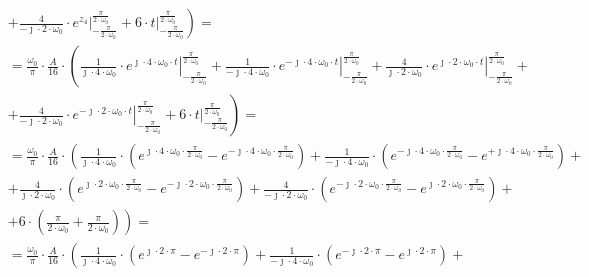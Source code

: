 \begin{task}
\begin{align*}
&\left.+\frac{4}{-\jmath \cdot 2 \cdot \omega_0} \cdot \left. e^{z_4}\right|_{-\frac{\pi}{2\cdot\omega_0}}^{\frac{\pi}{2\cdot\omega_0}} + 6 \cdot  \left.t \right|_{-\frac{\pi}{2\cdot\omega_0}}^{\frac{\pi}{2\cdot\omega_0}}\right)=\\
&=\frac{\omega_0}{\pi} \cdot \frac{A}{16} \cdot \left(\frac{1}{\jmath \cdot 4 \cdot \omega_0} \cdot \left. e^{\jmath \cdot 4 \cdot \omega_0 \cdot t}\right|_{-\frac{\pi}{2\cdot\omega_0}}^{\frac{\pi}{2\cdot\omega_0}} +\frac{1}{-\jmath \cdot 4 \cdot \omega_0}\cdot \left. e^{-\jmath \cdot 4 \cdot \omega_0 \cdot t}\right|_{-\frac{\pi}{2\cdot\omega_0}}^{\frac{\pi}{2\cdot\omega_0}} +\frac{4}{\jmath \cdot 2 \cdot \omega_0}\cdot \left. e^{\jmath \cdot 2 \cdot \omega_0 \cdot t}\right|_{-\frac{\pi}{2\cdot\omega_0}}^{\frac{\pi}{2\cdot\omega_0}} \right.+\\
&\left.+\frac{4}{-\jmath \cdot 2 \cdot \omega_0} \cdot \left. e^{-\jmath \cdot 2 \cdot \omega_0 \cdot t}\right|_{-\frac{\pi}{2\cdot\omega_0}}^{\frac{\pi}{2\cdot\omega_0}} + 6 \cdot  \left.t \right|_{-\frac{\pi}{2\cdot\omega_0}}^{\frac{\pi}{2\cdot\omega_0}}\right)=\\
&=\frac{\omega_0}{\pi} \cdot \frac{A}{16} \cdot \left(\frac{1}{\jmath \cdot 4 \cdot \omega_0} \cdot \left( e^{\jmath \cdot 4 \cdot \omega_0 \cdot \frac{\pi}{2\cdot\omega_0}} - e^{-\jmath \cdot 4 \cdot \omega_0 \cdot \frac{\pi}{2\cdot\omega_0}}\right) +\frac{1}{-\jmath \cdot 4 \cdot \omega_0}\cdot \left( e^{-\jmath \cdot 4 \cdot \omega_0 \cdot \frac{\pi}{2\cdot\omega_0}} - e^{+\jmath \cdot 4 \cdot \omega_0 \cdot \frac{\pi}{2\cdot\omega_0}}\right) \right.+\\
&\left.+\frac{4}{\jmath \cdot 2 \cdot \omega_0}\cdot \left( e^{\jmath \cdot 2 \cdot \omega_0 \cdot \frac{\pi}{2\cdot\omega_0}} - e^{-\jmath \cdot 2 \cdot \omega_0 \cdot \frac{\pi}{2\cdot\omega_0}}\right) +\frac{4}{-\jmath \cdot 2 \cdot \omega_0} \cdot \left( e^{-\jmath \cdot 2 \cdot \omega_0 \cdot \frac{\pi}{2\cdot\omega_0}} - e^{\jmath \cdot 2 \cdot \omega_0 \cdot \frac{\pi}{2\cdot\omega_0}}\right) \right.+\\
&+\left. 6 \cdot  \left( \frac{\pi}{2\cdot\omega_0} + \frac{\pi}{2\cdot\omega_0} \right)\right)=\\
&=\frac{\omega_0}{\pi} \cdot \frac{A}{16} \cdot \left(\frac{1}{\jmath \cdot 4 \cdot \omega_0} \cdot \left( e^{\jmath \cdot 2 \cdot \pi} - e^{-\jmath \cdot 2 \cdot \pi}\right) +\frac{1}{-\jmath \cdot 4 \cdot \omega_0}\cdot \left( e^{-\jmath \cdot 2 \cdot \pi} - e^{\jmath \cdot 2 \cdot \pi}\right)\right.+\\

\end{align*}
\end{task}
